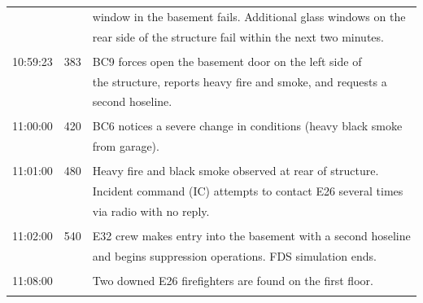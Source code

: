 \documentclass[12pt,oneside]{book}
\begin{document}
\begin{table}[!ht]
\begin{tabular}{ccl}
               &              &  window in the basement fails. Additional glass windows on the       \\
               &              &  rear side of the structure fail within the next two minutes.        \\
               &              &                                                                      \\
10:59:23       &  383         &  BC9 forces open the basement door on the left side of               \\
               &              &  the structure, reports heavy fire and smoke, and requests a         \\
               &              &  second hoseline.                                                    \\
               &              &                                                                      \\
11:00:00       &  420         &  BC6 notices a severe change in conditions (heavy black smoke        \\
               &              &  from garage).                                                       \\
               &              &                                                                      \\
11:01:00       &  480         &  Heavy fire and black smoke observed at rear of structure.           \\
               &              &  Incident command (IC) attempts to contact E26 several times         \\
               &              &  via radio with no reply.                                            \\
               &              &                                                                      \\
11:02:00       &  540         &  E32 crew makes entry into the basement with a second hoseline       \\
               &              &  and begins suppression operations. FDS simulation ends.             \\
               &              &                                                                      \\
11:08:00       &              &  Two downed E26 firefighters are found on the first floor.           \\
               &              &                                                                      \\

\end{tabular}
\end{table}
\end{document}
